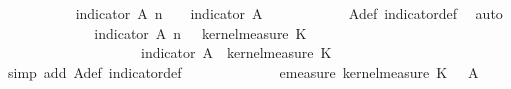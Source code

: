 \begin{isabellebody}
\ \ \ \ \ \ \ \ \isamarkupfalse%
\ {\isachardoublequoteopen}{\isacharparenleft}{\kern0pt}{\isasymlambda}{\isasymomega}\ indicator\ {\isacharparenleft}{\kern0pt}A\ n{\isacharparenright}{\kern0pt}\ {\isacharparenleft}{\kern0pt}{\isasymomega}\ {\isasymomega}\ {\isacharequal}{\kern0pt}\ indicator\ A{\isacharprime}{\kern0pt}{\isachardoublequoteclose}\isanewline
\ \ \ \ \ \ \ \ \ \ \isamarkupfalse%
\ A{\isacharprime}{\kern0pt}{\isacharunderscore}{\kern0pt}def\ indicator{\isacharunderscore}{\kern0pt}def\ \isamarkupfalse%
\ auto\isanewline
\ \ \ \ \ \ \ \ \isamarkupfalse%
\ \isamarkupfalse%
\ {\isachardoublequoteopen}{\isacharparenleft}{\kern0pt}{\isasymintegral}\isactrlsup {\isacharplus}{\kern0pt}\ {\isasymomega}\ indicator\ {\isacharparenleft}{\kern0pt}A\ n{\isacharparenright}{\kern0pt}\ {\isacharparenleft}{\kern0pt}{\isasymomega}\ {\isasymomega}\ {\isasympartial}kernel{\isacharunderscore}{\kern0pt}measure\ K{\isacharunderscore}{\kern0pt}{}\ {\isacharparenleft}{\kern0pt}{\isasymomega}\ {\isasymomega}\isanewline
\ \ \ \ \ \ \ \ \ \ \ \ \ \ \ \ \ {\isacharequal}{\kern0pt}\ {\isacharparenleft}{\kern0pt}{\isasymintegral}\isactrlsup {\isacharplus}{\kern0pt}\ {\isasymomega}\ indicator\ A{\isacharprime}{\kern0pt}\ {\isasymomega}\ {\isasympartial}kernel{\isacharunderscore}{\kern0pt}measure\ K{\isacharunderscore}{\kern0pt}{}\ {\isacharparenleft}{\kern0pt}{\isasymomega}\ {\isasymomega}\isanewline
\ \ \ \ \ \ \ \ \ \ \isamarkupfalse%
\ {\isacharparenleft}{\kern0pt}simp\ add{\isacharcolon}{\kern0pt}\ A{\isacharprime}{\kern0pt}{\isacharunderscore}{\kern0pt}def\ indicator{\isacharunderscore}{\kern0pt}def{\isacharparenright}{\kern0pt}\isanewline
\ \ \ \ \ \ \ \ \isamarkupfalse%
\ \isamarkupfalse%
\ {\isachardoublequoteopen}{\isachardot}{\kern0pt}{\isachardot}{\kern0pt}{\isachardot}{\kern0pt}\ {\isacharequal}{\kern0pt}\ emeasure\ {\isacharparenleft}{\kern0pt}kernel{\isacharunderscore}{\kern0pt}measure\ K{\isacharunderscore}{\kern0pt}{}\ {\isacharparenleft}{\kern0pt}{\isasymomega}\ {\isasymomega}\ A{\isacharprime}{\kern0pt}{\isachardoublequoteclose}\isanewline

\end{isabellebody}
